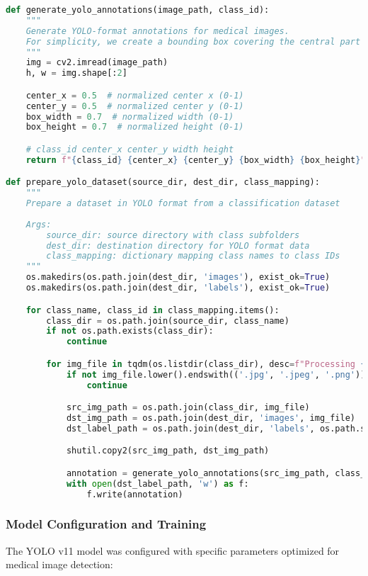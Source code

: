 \begin{lstlisting}[language=Python, caption={COVID-19 X-ray Dataset Preparation}, label={lst:covid-dataset}]
def generate_yolo_annotations(image_path, class_id):
    """
    Generate YOLO-format annotations for medical images.
    For simplicity, we create a bounding box covering the central part of the image
    """
    img = cv2.imread(image_path)
    h, w = img.shape[:2]

    center_x = 0.5  # normalized center x (0-1)
    center_y = 0.5  # normalized center y (0-1)
    box_width = 0.7  # normalized width (0-1)
    box_height = 0.7  # normalized height (0-1)

    # class_id center_x center_y width height
    return f"{class_id} {center_x} {center_y} {box_width} {box_height}"

def prepare_yolo_dataset(source_dir, dest_dir, class_mapping):
    """
    Prepare a dataset in YOLO format from a classification dataset
    
    Args:
        source_dir: source directory with class subfolders
        dest_dir: destination directory for YOLO format data
        class_mapping: dictionary mapping class names to class IDs
    """
    os.makedirs(os.path.join(dest_dir, 'images'), exist_ok=True)
    os.makedirs(os.path.join(dest_dir, 'labels'), exist_ok=True)

    for class_name, class_id in class_mapping.items():
        class_dir = os.path.join(source_dir, class_name)
        if not os.path.exists(class_dir):
            continue

        for img_file in tqdm(os.listdir(class_dir), desc=f"Processing {class_name}"):
            if not img_file.lower().endswith(('.jpg', '.jpeg', '.png')):
                continue

            src_img_path = os.path.join(class_dir, img_file)
            dst_img_path = os.path.join(dest_dir, 'images', img_file)
            dst_label_path = os.path.join(dest_dir, 'labels', os.path.splitext(img_file)[0] + '.txt')

            shutil.copy2(src_img_path, dst_img_path)

            annotation = generate_yolo_annotations(src_img_path, class_id)
            with open(dst_label_path, 'w') as f:
                f.write(annotation)
\end{lstlisting}

\subsubsection{Model Configuration and Training}
The YOLO v11 model was configured with specific parameters optimized for medical image detection:

